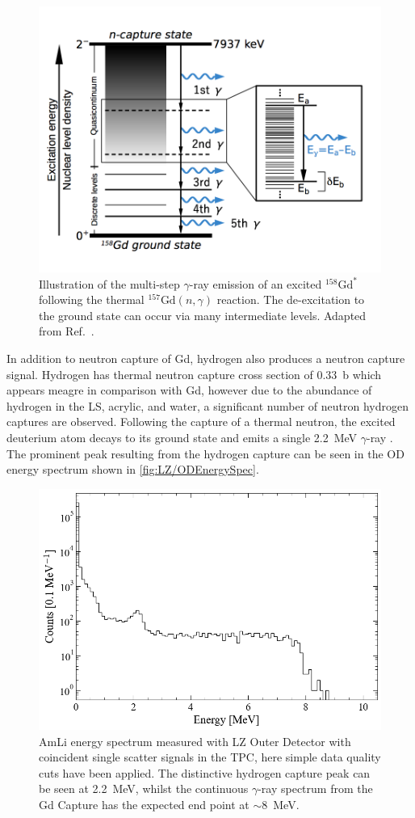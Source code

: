 \begin{figure}[!ht]
    \centering
    \includegraphics[width=0.7\linewidth]{figures/LZ/ContinuumEmission2.png}
    \caption[Illustration of the multi-step $\gamma$-ray emission of an excited $^{158}\text{Gd}^*$ following the thermal $^{157}\text{Gd}(n,\gamma)$ reaction.]{Illustration of the multi-step $\gamma$-ray emission of an excited $^{158}\text{Gd}^*$ following the thermal $^{157}\text{Gd}(n,\gamma)$ reaction. The de-excitation to the ground state can occur via many intermediate levels. Adapted from Ref.~\cite{Hagiwara:2018kmr}.}
    \label{fig:LZ/Gd158Deexcite}
\end{figure}
In addition to neutron capture of Gd, hydrogen also produces a neutron capture signal. Hydrogen has thermal neutron capture cross section of 0.33~b which appears meagre in comparison with Gd, however due to the abundance of hydrogen in the LS, acrylic, and water, a significant number of neutron hydrogen captures are observed. Following the capture of a thermal neutron, the excited deuterium atom decays to its ground state and emits a single 2.2~MeV $\gamma$-ray \cite{LZTDR}. The prominent peak resulting from the hydrogen capture can be seen in the OD energy spectrum shown in \autoref{fig:LZ/ODEnergySpec}.
\begin{figure}[!ht]
    \centering
    \includegraphics[width=0.7\linewidth]{figures/LZ/ODEnergySpec.png}
    \caption[AmLi energy spectrum measured with LZ Outer Detector with coincident single scatter signals in the TPC]{AmLi energy spectrum measured with LZ Outer Detector with coincident single scatter signals in the TPC, here simple data quality cuts have been applied. The distinctive hydrogen capture peak can be seen at 2.2~MeV, whilst the continuous $\gamma$-ray spectrum from the Gd Capture has the expected end point at $\mathtt{\sim}$8~MeV.}
    \label{fig:LZ/ODEnergySpec}
\end{figure}
